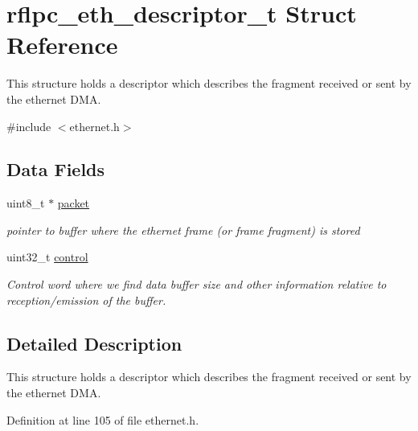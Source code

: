 \hypertarget{structrflpc__eth__descriptor__t}{\section{rflpc\-\_\-eth\-\_\-descriptor\-\_\-t Struct Reference}
\label{structrflpc__eth__descriptor__t}
}


This structure holds a descriptor which describes the fragment received or sent by the ethernet D\-M\-A.  




{\ttfamily \#include $<$ethernet.\-h$>$}

\subsection*{Data Fields}
\begin{DoxyCompactItemize}
\item 
\hypertarget{structrflpc__eth__descriptor__t_ac93c678c8423af948096ac5e5c8085fd}{uint8\-\_\-t $\ast$ \hyperlink{structrflpc__eth__descriptor__t_ac93c678c8423af948096ac5e5c8085fd}{packet}}\label{structrflpc__eth__descriptor__t_ac93c678c8423af948096ac5e5c8085fd}

\begin{DoxyCompactList}\small\item\em pointer to buffer where the ethernet frame (or frame fragment) is stored \end{DoxyCompactList}\item 
uint32\-\_\-t \hyperlink{structrflpc__eth__descriptor__t_ae45a50fb32e3ce25a5802290397dfe7e}{control}
\begin{DoxyCompactList}\small\item\em Control word where we find data buffer size and other information relative to reception/emission of the buffer. \end{DoxyCompactList}\end{DoxyCompactItemize}


\subsection{Detailed Description}
This structure holds a descriptor which describes the fragment received or sent by the ethernet D\-M\-A. 

Definition at line 105 of file ethernet.\-h.



